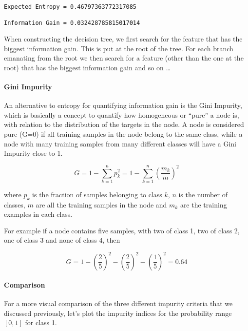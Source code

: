 \documentclass{article}
\begin{document}
    \begin{Verbatim}[commandchars=\\\{\}]
Expected Entropy = 0.46797363772317085

Information Gain = 0.032428785815017014

    \end{Verbatim}

    When constructing the decision tree, we first search for the feature
that has the biggest information gain. This is put at the root of the
tree. For each branch emanating from the root we then search for a
feature (other than the one at the root) that has the biggest
information gain and so on \ldots{}

    \paragraph{Gini Impurity}\label{gini-impurity}

An alternative to entropy for quantifying information gain is the Gini
Impurity, which is basically a concept to quantify how homogeneous or
``pure'' a node is, with relation to the distribution of the targets in
the node. A node is considered pure (G=0) if all training samples in the
node belong to the same class, while a node with many training samples
from many different classes will have a Gini Impurity close to 1.

    \begin{equation}
G = 1 - \sum\limits_{k=1}^n p_k^2 = 1 - \sum\limits_{k=1}^n \left( \frac{m_k}{m} \right)^2 
\end{equation}

where \(p_k\) is the fraction of samples belonging to class \(k\), \(n\)
is the number of classes, \(m\) are all the training samples in the node
and \(m_k\) are the training examples in each class.

For example if a node contains five samples, with two of class 1, two of
class 2, one of class 3 and none of class 4, then

\[G = 1 - \left( \frac{2}{5} \right)^2 - \left( \frac{2}{5} \right)^2  - \left( \frac{1}{5} \right)^2  = 0.64\]

    \paragraph{Comparison}\label{comparison}

For a more visual comparison of the three different impurity criteria
that we discussed previously, let's plot the impurity indices for the
probability range \([0, 1]\) for class 1.
\end{document}
